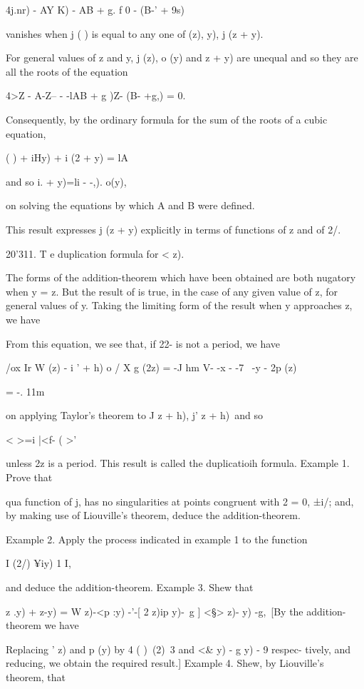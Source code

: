 {4j.nr) - AY K) - AB + g. f 0 - (B-' + 9s)

vanishes when j ( ) is equal to any one of (z), y), j (z + y).

For general values of z and y, j (z), o (y) and z + y) are unequal and
so they are all the roots of the equation

4>Z - A-Z-- - -lAB + g )Z- (B- +g,) = 0.

Consequently, by the ordinary formula for the sum of the roots of a
cubic equation,

 ( ) + iHy) + i (2 + y) = lA%

and so i. + y)=li - -,). o(y),

on solving the equations by which A and B were defined.

This result expresses j (z + y) explicitly in terms of functions of z
and of 2/.

20'311. T e duplication formula for < z).

The forms of the addition-theorem which have been obtained are both
nugatory when y = z. But the result of is true, in the case of
any given value of z, for general values of y. Taking the limiting
form of the result when y approaches z, we have

From this equation, we see that, if 22- is not a period, we have

/ox Ir W (z) - i ' + h) o / X g (2z) = -J hm V- -x - -7 ~-y - 2p (z)

= -. 11m

on applying Taylor's theorem to J z + h), j' z + h)\ and so

 < >=i |<f- ( >'

unless 2z is a period. This result is called the duplicatioih formula.
Example 1. Prove that

qua function of j, has no singularities at points congruent with 2 =
0, ±i/; and, by making use of Liouville's theorem, deduce the
addition-theorem.

%
%

Example 2. Apply the process indicated in example 1 to the function

I (2/) ¥iy) 1 I,

and deduce the addition-theorem. Example 3. Shew that

  z .y) + z-y) = W z)-<p :y) -'-[ 2 z)ip y)-\ g ] <§> z)- y) -g,\ [By
the addition-theorem we have

Replacing ' z) and p (y) by 4 ( )\ (2)\ 3 and <\& y) - g y) - 9
respec- tively, and reducing, we obtain the required result.] Example
4. Shew, by Liouville's theorem, that

}
